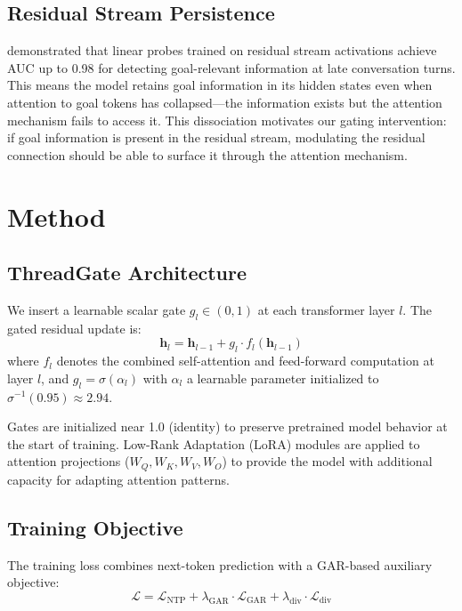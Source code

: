 \documentclass[11pt,a4paper]{article}
\begin{document}
\subsection{Residual Stream Persistence}

\citet{dongre2026} demonstrated that linear probes trained on residual stream activations achieve AUC up to 0.98 for detecting goal-relevant information at late conversation turns.
This means the model retains goal information in its hidden states even when attention to goal tokens has collapsed---the information exists but the attention mechanism fails to access it.
This dissociation motivates our gating intervention: if goal information is present in the residual stream, modulating the residual connection should be able to surface it through the attention mechanism.

\section{Method}

\subsection{ThreadGate Architecture}

We insert a learnable scalar gate $g_l \in (0, 1)$ at each transformer layer $l$.
The gated residual update is:
\begin{equation}
    \mathbf{h}_l = \mathbf{h}_{l-1} + g_l \cdot f_l(\mathbf{h}_{l-1})
\end{equation}
where $f_l$ denotes the combined self-attention and feed-forward computation at layer $l$, and $g_l = \sigma(\alpha_l)$ with $\alpha_l$ a learnable parameter initialized to $\sigma^{-1}(0.95) \approx 2.94$.

Gates are initialized near 1.0 (identity) to preserve pretrained model behavior at the start of training.
Low-Rank Adaptation (LoRA) modules are applied to attention projections ($W_Q, W_K, W_V, W_O$) to provide the model with additional capacity for adapting attention patterns.

\subsection{Training Objective}

The training loss combines next-token prediction with a GAR-based auxiliary objective:
\begin{equation}
    \mathcal{L} = \mathcal{L}_{\text{NTP}} + \lambda_{\text{GAR}} \cdot \mathcal{L}_{\text{GAR}} + \lambda_{\text{div}} \cdot \mathcal{L}_{\text{div}}
\end{equation}
\end{document}
